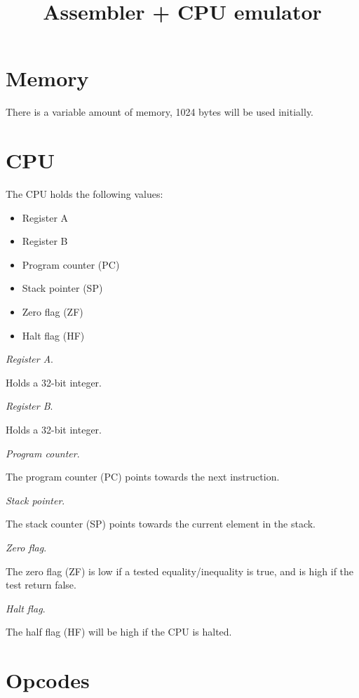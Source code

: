 \documentclass[11pt]{article}
\title{Assembler + CPU emulator}
\providecommand{\tightlist}{%
      \setlength{\itemsep}{0pt}\setlength{\parskip}{0pt}}
\begin{document}
    
    
    \maketitle
    
    

    
    \hypertarget{memory}{%
\section{Memory}\label{memory}}

    There is a variable amount of memory, 1024 bytes will be used initially.

    \hypertarget{cpu}{%
\section{CPU}\label{cpu}}

    The CPU holds the following values:

\begin{itemize}
\tightlist
\item
  Register A
\item
  Register B
\item
  Program counter (PC)
\item
  Stack pointer (SP)
\item
  Zero flag (ZF)
\item
  Halt flag (HF)
\end{itemize}

\emph{Register A}.

Holds a 32-bit integer.

\emph{Register B}.

Holds a 32-bit integer.

\emph{Program counter}.

The program counter (PC) points towards the next instruction.

\emph{Stack pointer}.

The stack counter (SP) points towards the current element in the stack.

\emph{Zero flag}.

The zero flag (ZF) is low if a tested equality/inequality is true, and
is high if the test return false.

\emph{Halt flag}.

The half flag (HF) will be high if the CPU is halted.

    \hypertarget{opcodes}{%
\section{Opcodes}\label{opcodes}}
\end{document}
